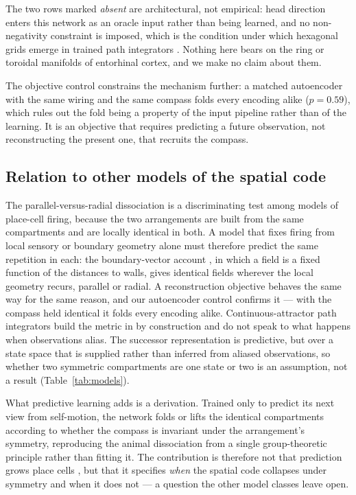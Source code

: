 \documentclass[9pt,lineno]{elife}
\begin{document}
The two rows marked \emph{absent} are architectural, not empirical: head direction enters this
network as an oracle input rather than being learned, and no non-negativity constraint is imposed,
which is the condition under which hexagonal grids emerge in trained path integrators
\citep{sorscher2023unified}. Nothing here bears on the ring or toroidal manifolds of entorhinal
cortex, and we make no claim about them.

The objective control constrains the mechanism further: a matched autoencoder with the same
wiring and the same compass folds every encoding alike ($p = 0.59$), which rules out the fold
being a property of the input pipeline rather than of the learning. It is an objective that
requires predicting a future observation, not reconstructing the present one, that recruits the
compass.

\subsection*{Relation to other models of the spatial code}

The parallel-versus-radial dissociation is a discriminating test among models of place-cell
firing, because the two arrangements are built from the same compartments and are locally
identical in both. A model that fixes firing from local sensory or boundary geometry alone must
therefore predict the same repetition in each: the boundary-vector account \citep{hartley2000},
in which a field is a fixed function of the distances to walls, gives identical fields wherever
the local geometry recurs, parallel or radial. A reconstruction objective behaves the same way
for the same reason, and our autoencoder control confirms it --- with the compass held identical
it folds every encoding alike. Continuous-attractor path integrators \citep{burak2009,
sorscher2023unified} build the metric in by construction and do not speak to what happens when
observations alias. The successor representation \citep{stachenfeld2017, momennejad2017successor}
is predictive, but over a state space that is supplied rather than inferred from aliased
observations, so whether two symmetric compartments are one state or two is an assumption, not a
result (Table~\ref{tab:models}).

What predictive learning adds is a derivation. Trained only to predict its next view from
self-motion, the network folds or lifts the identical compartments according to whether the
compass is invariant under the arrangement's symmetry, reproducing the animal dissociation from a
single group-theoretic principle rather than fitting it. The contribution is therefore not that
prediction grows place cells \citep{levenstein2024}, but that it specifies \emph{when} the
spatial code collapses under symmetry and when it does not --- a question the other model classes
leave open.
\end{document}
